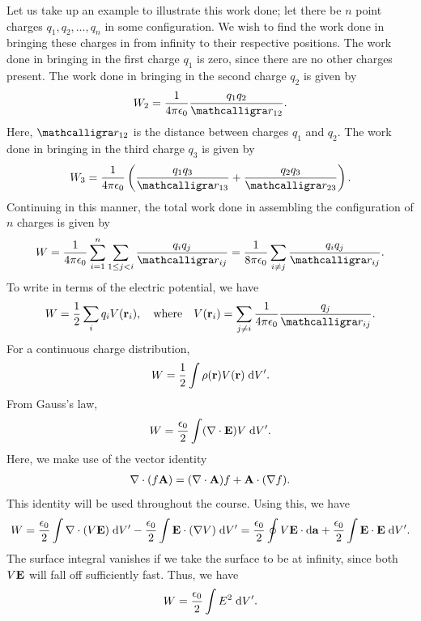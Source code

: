 Let us take up an example to illustrate this work done; let there be $n$ point charges $q_{1}, q_{2}, \ldots, q_{n}$ in some configuration. We wish to find the work done in bringing these charges in from infinity to their respective positions. The work done in bringing in the first charge $q_{1}$ is zero, since there are no other charges present. The work done in bringing in the second charge $q_{2}$ is given by
\begin{align}
    W_{2} = \frac{1}{4 \pi \epsilon_{0}} \frac{q_{1} q_{2}}{\curs{r}_{12}}.
\end{align}
Here, $\curs{r}_{12}$ is the distance between charges $q_{1}$ and $q_{2}$. The work done in bringing in the third charge $q_{3}$ is given by
\begin{align}
    W_{3} = \frac{1}{4 \pi \epsilon_{0}} \left( \frac{q_{1} q_{3}}{\curs{r}_{13}} + \frac{q_{2} q_{3}}{\curs{r}_{23}} \right).
\end{align}
Continuing in this manner, the total work done in assembling the configuration of $n$ charges is given by
\begin{align}
    W = \frac{1}{4 \pi \epsilon_{0}} \sum_{i = 1}^{n} \sum_{1 \leq j < i} \frac{q_{i} q_{j}}{\curs{r}_{ij}} = \frac{1}{8 \pi \epsilon_{0}} \sum_{i \neq j} \frac{q_{i} q_{j}}{\curs{r}_{ij}}.
\end{align}
To write in terms of the electric potential, we have
\begin{align}
    W = \frac{1}{2} \sum_{i} q_{i} V(\bv{r}_{i}), \quad \text{where} \quad V(\bv{r}_{i}) = \sum_{j \neq i} \frac{1}{4 \pi \epsilon_{0}} \frac{q_{j}}{\curs{r}_{ij}}.
\end{align}
For a continuous charge distribution,
\begin{align}
    W = \frac{1}{2} \int \rho(\mathbf{r}) V(\mathbf{r}) \; \mathrm{d}V'.
\end{align}
From Gauss's law,
\begin{align}
    W = \frac{\epsilon_{0}}{2} \int (\nabla \cdot \mathbf{E}) V \; \mathrm{d}V'.
\end{align}
Here, we make use of the vector identity
\begin{align}
    \nabla \cdot (f \mathbf{A}) = (\nabla \cdot \mathbf{A}) f + \mathbf{A} \cdot (\nabla f).
\end{align}
This identity will be used throughout the course. Using this, we have
\begin{align}
    W = \frac{\epsilon_{0}}{2} \int \nabla \cdot (V \mathbf{E}) \; \mathrm{d}V' - \frac{\epsilon_{0}}{2} \int \mathbf{E} \cdot (\nabla V) \; \mathrm{d}V' = \frac{\epsilon_{0}}{2} \oint V \mathbf{E} \cdot \mathrm{d}\mathbf{a} + \frac{\epsilon_{0}}{2} \int \mathbf{E} \cdot \mathbf{E} \; \mathrm{d}V'.
\end{align}
The surface integral vanishes if we take the surface to be at infinity, since both $V\mathbf{E}$ will fall off sufficiently fast. Thus, we have
\begin{align}
    W = \frac{\epsilon_{0}}{2} \int E^{2} \; \mathrm{d}V'.
\end{align}

